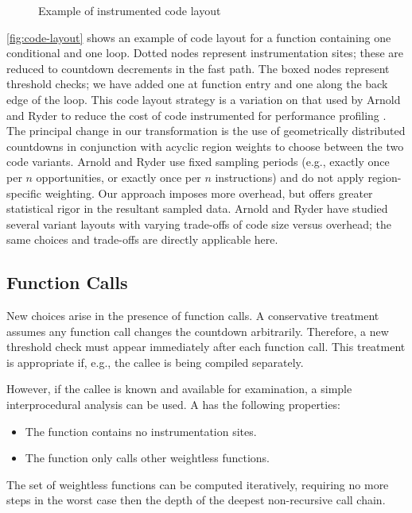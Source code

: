 \begin{figure}
  \centering
  
  \caption{Example of instrumented code layout}
  \label{fig:code-layout}
\end{figure}

\autoref{fig:code-layout} shows an example of code layout for a
function containing one conditional and one loop.  Dotted nodes
represent instrumentation sites; these are reduced to countdown
decrements in the fast path.  The boxed nodes represent threshold
checks; we have added one at function entry and one along the back
edge of the loop.  This code layout strategy is a variation on that
used by Arnold and Ryder to reduce the cost of code instrumented for
performance profiling \cite{Arnold:2001:FRC}.  The principal change in
our transformation is the use of geometrically distributed countdowns
in conjunction with acyclic region weights to choose between the two
code variants.  Arnold and Ryder use fixed sampling periods (e.g.,
exactly once per $n$ opportunities, or exactly once per $n$
instructions) and do not apply region-specific weighting.  Our
approach imposes more overhead, but offers greater statistical rigor
in the resultant sampled data.  Arnold and Ryder have studied several
variant layouts with varying trade-offs of code size versus overhead;
the same choices and trade-offs are directly applicable here.

\subsection{Function Calls}

New choices arise in the presence of function calls.  A conservative
treatment assumes any function call changes the countdown arbitrarily.
Therefore, a new threshold check must appear immediately after each
function call.  This treatment is appropriate if, e.g., the callee is
being compiled separately.

However, if the callee is known and available for examination, a
simple interprocedural analysis can be used.  A  has the following properties:

\begin{itemize}
\item The function contains no instrumentation sites.
\item The function only calls other weightless functions.
\end{itemize}

The set of weightless functions can be computed iteratively, requiring
no more steps in the worst case then the depth of the deepest
non-recursive call chain.


